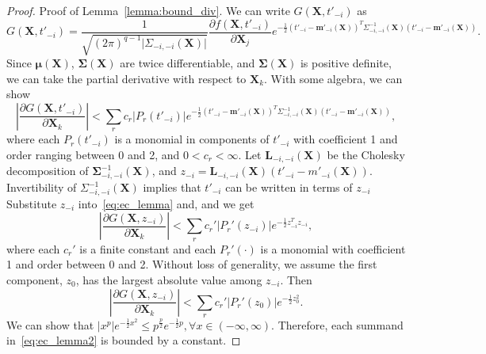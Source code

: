 \documentclass[paper=letter]{scrartcl}
\begin{document}
\begin{proof}{Proof of Lemma~\ref{lemma:bound_div}.} We can write $G(\bm{X}, t'_{-i})$ as
\begin{equation*}
 G(\bm{X}, t'_{-i}) = \frac{1}{\sqrt{(2\pi)^{q-1} \lvert \Sigma_{-i,-i}(\bm{X}) \rvert}} \frac{\partial f(\bm{X}, t'_{-i})}{\partial \bm{X}_j} e ^{-\frac{1}{2} \left(t'_{-i} - \bm{m}'_{-i}(\bm{X}) \right)^T \Sigma^{-1}_{-i,-i}(\bm{X}) \left(t'_{-i} - \bm{m}'_{-i}(\bm{X}) \right)}.
\end{equation*}
Since $\bm{\mu}(\bm{X})$, $\bm{\Sigma}(\bm{X})$ are twice differentiable, and $\bm{\Sigma}(\bm{X})$ is positive definite, we can
take the partial derivative with respect to $\bm{X}_k$. With some algebra, we can show
\begin{equation} \label{eq:ec_lemma}
\left\lvert \frac{\partial G(\bm{X}, t'_{-i})}{\partial \bm{X}_k} \right\rvert < \sum_r c_r \lvert P_r(t'_{-i}) \rvert e ^{-\frac{1}{2} \left(t'_{-i} - \bm{m}'_{-i}(\bm{X}) \right)^T \Sigma^{-1}_{-i,-i}(\bm{X}) \left(t'_{-i} - \bm{m}'_{-i}(\bm{X}) \right)},
\end{equation}
where each $P_r(t'_{-i})$ is a monomial in components of $t'_{-i}$ with coefficient 1 and order ranging between 0 and 2, and $0 < c_r < \infty$.
Let $\bm{L}_{-i,-i}(\bm{X})$ be the Cholesky decomposition of $\bm{\Sigma}^{-1}_{-i,-i}(\bm{X})$, and $z_{-i} = \bm{L}_{-i,-i}(\bm{X}) \left( t'_{-i} - m'_{-i}(\bm{X})\right)$.  Invertibility of $\Sigma^{-1}_{-i,-i}(\bm{X})$ implies that $t'_{-i}$ can be written in terms of $z_{-i}$
Substitute $z_{-i}$ into~\eqref{eq:ec_lemma} and, and we get
\begin{equation*}
     \left\lvert \frac{\partial G(\bm{X}, z_{-i})}{\partial \bm{X}_k} \right\rvert < \sum_r c_r' \lvert P_r'(z_{-i}) \rvert e ^{-\frac{1}{2} z_{-i}^T z_{-i}},
\end{equation*}
where each $c_r'$ is a finite constant and each $P_r'(\cdot)$ is a monomial with coefficient 1 and order between 0 and 2. Without loss of generality, we assume the first component, $z_0$, has the largest absolute value among $z_{-i}$. Then
\begin{equation} \label{eq:ec_lemma2}
     \left\lvert \frac{\partial G(\bm{X}, z_{-i})}{\partial \bm{X}_k} \right\rvert < \sum_r c_r' \lvert P_r'(z_0) \rvert e ^{-\frac{1}{2} z_0^2}.
\end{equation}
We can show that $\lvert x^p \rvert e^{-\frac{1}{2}x^2} \leq p^{\frac{p}{2}} e^{-\frac{1}{2}p}, \forall x\in(-\infty,\infty)$. Therefore, each summand in~\eqref{eq:ec_lemma2} is bounded by a constant. 
\end{proof}
\end{document}
